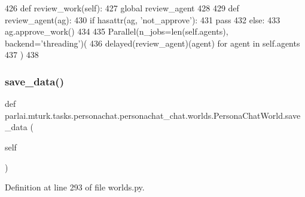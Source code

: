 \begin{DoxyCode}
426     \textcolor{keyword}{def }review\_work(self):
427         \textcolor{keyword}{global} review\_agent
428 
429         \textcolor{keyword}{def }review\_agent(ag):
430             \textcolor{keywordflow}{if} hasattr(ag, \textcolor{stringliteral}{'not\_approve'}):
431                 \textcolor{keywordflow}{pass}
432             \textcolor{keywordflow}{else}:
433                 ag.approve\_work()
434 
435         Parallel(n\_jobs=len(self.agents), backend=\textcolor{stringliteral}{'threading'})(
436             delayed(review\_agent)(agent) \textcolor{keywordflow}{for} agent \textcolor{keywordflow}{in} self.agents
437         )
438 \end{DoxyCode}
\mbox{\label{classparlai_1_1mturk_1_1tasks_1_1personachat_1_1personachat__chat_1_1worlds_1_1PersonaChatWorld_ad0266a390c3789b1351a19b8bcad2696}} 
\subsubsection{\texorpdfstring{save\+\_\+data()}{save\_data()}}
{\footnotesize\ttfamily def parlai.\+mturk.\+tasks.\+personachat.\+personachat\+\_\+chat.\+worlds.\+Persona\+Chat\+World.\+save\+\_\+data (\begin{DoxyParamCaption}\item[{}]{self }\end{DoxyParamCaption})}



Definition at line 293 of file worlds.\+py.


